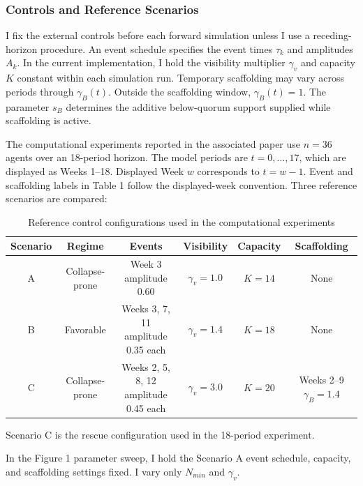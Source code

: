 \documentclass[11pt]{article}
\begin{document}
\subsubsection{Controls and Reference Scenarios}
I fix the external controls before each forward simulation unless I use a receding-horizon procedure. An event schedule specifies the event times $\tau_k$ and amplitudes $A_k$. In the current implementation, I hold the visibility multiplier $\gamma_v$ and capacity $K$ constant within each simulation run. Temporary scaffolding may vary across periods through $\gamma_B(t)$. Outside the scaffolding window, $\gamma_B(t)=1$. The parameter $s_B$ determines the additive below-quorum support supplied while scaffolding is active.

The computational experiments reported in the associated paper use $n=36$ agents over an 18-period horizon. The model periods are $t=0, \ldots, 17$, which are displayed as Weeks 1--18. Displayed Week $w$ corresponds to $t=w-1$. Event and scaffolding labels in Table 1 follow the displayed-week convention. Three reference scenarios are compared:

\begin{table}[h]
    \centering
    \begin{tabular}{|c|c|c|c|c|c|}
    \hline
         Scenario&  Regime&  Events&  Visibility&  Capacity& Scaffolding\\
    \hline
         A&  Collapse-prone&  \makecell{Week 3\\amplitude 0.60}&  $\gamma_v=1.0$&  $K=14$& None\\
    \hline
         B&  Favorable& \makecell{Weeks 3, 7, 11\\amplitude 0.35 each}&  $\gamma_v=1.4$&  $K=18$& None\\
    \hline
         C&  Collapse-prone&  \makecell{Weeks 2, 5, 8, 12\\amplitude 0.45 each}&  $\gamma_v=3.0$& $K=20$& \makecell{Weeks 2--9\\$\gamma_B=1.4$}\\
    \hline
    \end{tabular}
    \caption{Reference control configurations used in the computational experiments}
\end{table}
Scenario C is the rescue configuration used in the 18-period experiment.

In the Figure 1 parameter sweep, I hold the Scenario A event schedule, capacity, and scaffolding settings fixed. I vary only $N_{min}$ and $\gamma_v$.
\end{document}
